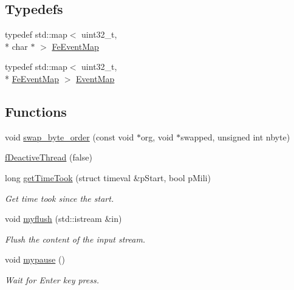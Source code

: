 \subsection*{Typedefs}
\begin{DoxyCompactItemize}
\item 
typedef std\-::map$<$ uint32\-\_\-t, \\*
char $\ast$ $>$ \hyperlink{namespace_ph2___hw_interface_a50d97ee46941c2c0c2ecadc929e41b05}{Fe\-Event\-Map}
\item 
typedef std\-::map$<$ uint32\-\_\-t, \\*
\hyperlink{namespace_ph2___hw_interface_a50d97ee46941c2c0c2ecadc929e41b05}{Fe\-Event\-Map} $>$ \hyperlink{namespace_ph2___hw_interface_acf9f41d647e7a3ad9bae233b04b9e3bc}{Event\-Map}
\end{DoxyCompactItemize}
\subsection*{Functions}
\begin{DoxyCompactItemize}
\item 
void \hyperlink{namespace_ph2___hw_interface_ad58bc815dfbb93c57791f3aecc84a1ea}{swap\-\_\-byte\-\_\-order} (const void $\ast$org, void $\ast$swapped, unsigned int nbyte)
\item 
\hyperlink{namespace_ph2___hw_interface_a45c84dee08a5b37d565bbcd5eeab2b4d}{f\-Deactive\-Thread} (false)
\item 
long \hyperlink{namespace_ph2___hw_interface_a033a07cbe28368de19d534ef7cd3325d}{get\-Time\-Took} (struct timeval \&p\-Start, bool p\-Mili)
\begin{DoxyCompactList}\small\item\em Get time took since the start. \end{DoxyCompactList}\item 
void \hyperlink{namespace_ph2___hw_interface_a2fe2ee1ddb69c79c23bf9b0b2fa58f67}{myflush} (std\-::istream \&in)
\begin{DoxyCompactList}\small\item\em Flush the content of the input stream. \end{DoxyCompactList}\item 
void \hyperlink{namespace_ph2___hw_interface_a20399ed909de2641f1e7e086a4ec3667}{mypause} ()
\begin{DoxyCompactList}\small\item\em Wait for Enter key press. \end{DoxyCompactList}\end{DoxyCompactItemize}


